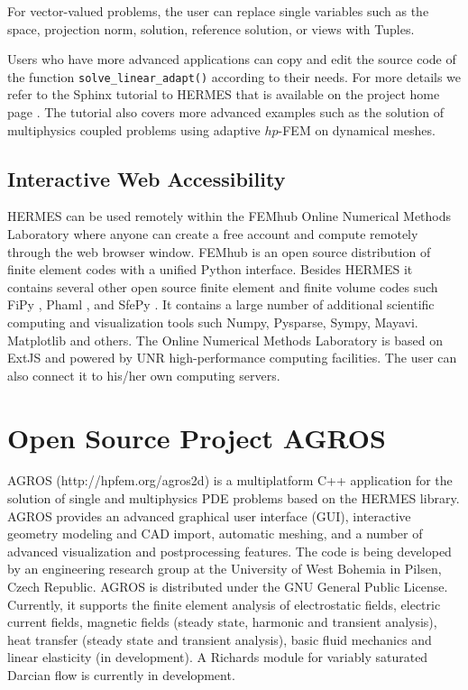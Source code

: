 \documentclass[final,3p,times,twocolumn]{elsarticle}
\begin{document}
For vector-valued problems, the 
user can replace single variables such as 
the space, projection norm, solution, reference solution, 
or views with Tuples.

Users who have more advanced applications can copy and 
edit the source code of the function {\tt solve\_linear\_adapt()}
according to their needs. For more details we refer to the 
Sphinx tutorial to HERMES that is available on the 
project home page \cite{hermes}. The tutorial also covers more advanced 
examples such as the solution of multiphysics coupled problems
using adaptive $hp$-FEM on dynamical meshes.   



\subsection{Interactive Web Accessibility}
\label{sec:onlinelab}

HERMES can be used remotely within the FEMhub Online Numerical Methods Laboratory
\cite{onlinelab} where anyone can create a free account and compute remotely 
through the web browser window. FEMhub \cite{femhub} is an open source distribution 
of finite element codes with a unified Python interface.
Besides HERMES it contains several other open source finite element and finite volume 
codes such FiPy \cite{fipy}, Phaml \cite{phaml}, and SfePy \cite{sfepy}.
It contains a large number of additional scientific computing and visualization 
tools such Numpy, Pysparse, Sympy, Mayavi. Matplotlib and others.   
The Online Numerical Methods Laboratory is based on ExtJS and powered 
by UNR high-performance computing facilities. The user can also connect 
it to his/her own computing servers.  

\section{Open Source Project AGROS}
\label{sec:agros}

AGROS (http://hpfem.org/agros2d) is a multiplatform C++ application for the solution 
of single and multiphysics PDE problems based on the HERMES library. AGROS provides 
an advanced graphical user interface (GUI), interactive geometry modeling and CAD import, 
automatic meshing, and a number of advanced visualization and postprocessing features. 
The code is being developed by an engineering research group at the University of West 
Bohemia in Pilsen, Czech Republic. AGROS is distributed under the GNU General Public 
License. Currently, it supports the finite element analysis of electrostatic fields,
electric current fields, magnetic fields (steady state, harmonic and transient analysis),
heat transfer (steady state and transient analysis), basic fluid mechanics and linear 
elasticity (in development). A Richards module for variably saturated Darcian %
flow is currently in development. 
\end{document}

